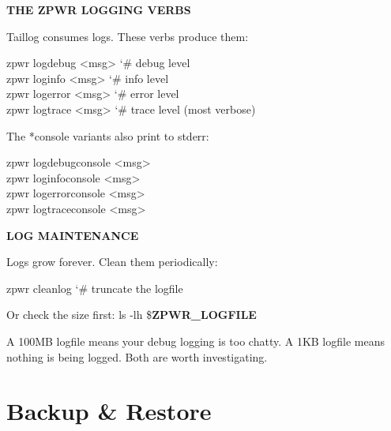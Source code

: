 \documentclass[11pt,a4paper,twoside]{book}
\begin{document}
\vspace{12pt}
{\bfseries\color{neonyellow} THE \textbf{ZPWR} LOGGING VERBS}\vspace{4pt}

Taillog consumes logs. These verbs produce them:

\begin{codebox}
\color{neongreen}zpwr logdebug <msg>                 {\char`\#} debug level\\
\color{neongreen}zpwr loginfo <msg>                  {\char`\#} info level\\
\color{neongreen}zpwr logerror <msg>                 {\char`\#} error level\\
\color{neongreen}zpwr logtrace <msg>                 {\char`\#} trace level (most verbose)\\
\end{codebox}

The *console variants also print to stderr:

\begin{codebox}
\color{neongreen}zpwr logdebugconsole <msg>\\
\color{neongreen}zpwr loginfoconsole <msg>\\
\color{neongreen}zpwr logerrorconsole <msg>\\
\color{neongreen}zpwr logtraceconsole <msg>\\
\end{codebox}


\vspace{12pt}
{\bfseries\color{neonyellow} LOG MAINTENANCE}\vspace{4pt}

Logs grow forever. Clean them periodically:

\begin{codebox}
\color{neongreen}zpwr cleanlog                       {\char`\#} truncate the logfile\\
\end{codebox}

Or check the size first: ls -lh \$\textbf{ZPWR\_LOGFILE}

A 100MB logfile means your debug logging is too chatty. A 1KB logfile means nothing is being logged. Both are worth investigating.


\vspace{16pt}

\section{Backup \& Restore}
\end{document}
